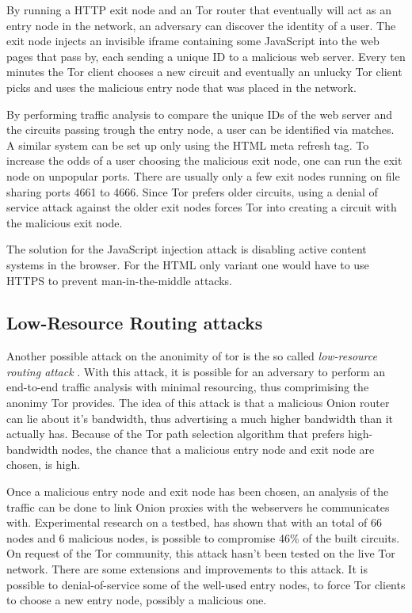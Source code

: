 \documentclass{article}
\begin{document}
		By running a HTTP exit node and an Tor router that eventually will act as an entry node in the network, an adversary can discover the identity of a user. The exit node injects an invisible iframe containing some JavaScript into the web pages that pass by, each sending a unique ID to a malicious web server. Every ten minutes the Tor client chooses a new circuit and eventually an unlucky Tor client picks and uses the malicious entry node that was placed in the network.

		By performing traffic analysis to compare the unique IDs of the web server and the circuits passing trough the entry node, a user can be identified via matches. A similar system can be set up only using the HTML meta refresh tag. To increase the odds of a user choosing the malicious exit node, one can run the exit node on unpopular ports. There are usually only a few exit nodes running on file sharing ports 4661 to 4666. Since Tor prefers older circuits, using a denial of service attack against the older exit nodes forces Tor into creating a circuit with the malicious exit node.

		The solution for the JavaScript injection attack is disabling active content systems in the browser. For the HTML only variant one would have to use HTTPS to prevent man-in-the-middle attacks.
		
	\subsection{Low-Resource Routing attacks}
		Another possible attack on the anonimity of tor is the so called \emph{low-resource routing attack} \cite{bauer2007low}. With this attack, it is possible for an adversary to perform an end-to-end traffic analysis with minimal resourcing, thus comprimising the anonimy Tor provides. The idea of this attack is that a malicious Onion router can lie about it's bandwidth, thus advertising a much higher bandwidth than it actually has. Because of the Tor path selection algorithm that prefers high-bandwidth nodes, the chance that a malicious entry node and exit node are chosen, is high.

		Once a malicious entry node and exit node has been chosen, an analysis of the traffic can be done to link Onion proxies with the webservers he communicates with. Experimental research on a testbed, has shown that with an total of 66 nodes and 6 malicious nodes, is possible to compromise 46\% of the built circuits. On request of the Tor community, this attack hasn't been tested on the live Tor network. There are some extensions and improvements to this attack. It is possible to denial-of-service some of the well-used entry nodes, to force Tor clients to choose a new entry node, possibly a malicious one.
\end{document}
